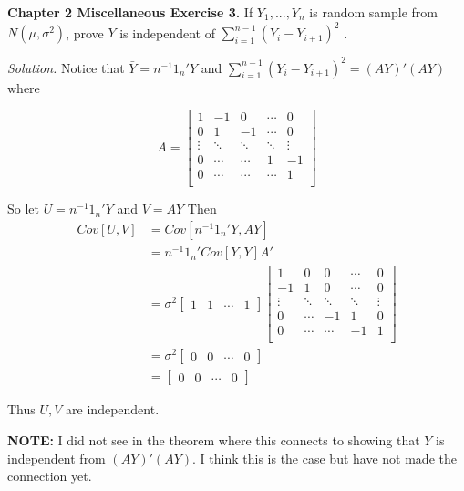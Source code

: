 \documentclass{article}
\begin{document}
\newpage
\textbf{Chapter 2 Miscellaneous Exercise 3. }
If \(Y_1, ..., Y_n\) is random sample from \(N(\mu, \sigma^2)\), prove \(\bar Y \) is independent of \(\sum_{i=1}^{n-1} (Y_i-Y_{i+1})^2\) .




 \vspace{3mm}
 
 \textit{Solution. } Notice that \(\bar Y= n^{-1}1_n' Y \) and \(\sum_{i=1}^{n-1} (Y_i-Y_{i+1})^2 = (AY)'(AY) \) 
 where
 
 \[A = \begin{bmatrix} 1&-1&0&\cdots&0\\
 0&1&-1&\cdots &0\\
 \vdots&\ddots&\ddots&\ddots & \vdots\\
 0&\cdots&\cdots &1& -1\\
  0&\cdots&\cdots &\cdots& 1\\
 \end{bmatrix}\]
 
 So let \(U =  n^{-1}1_n' Y\) and \(V = AY\) Then 
 \begin{align*}
 Cov[U,V] &= Cov[ n^{-1}1_n' Y,AY]  \\
 &= n^{-1}1_n' Cov[Y,Y] A' \\
 &=\sigma^2\begin{bmatrix}
 1&1&\cdots&1
 \end{bmatrix}
 \begin{bmatrix} 1&0&0&\cdots&0\\
 -1&1&0&\cdots &0\\
 \vdots&\ddots&\ddots&\ddots & \vdots\\
 0&\cdots&-1 &1& 0\\
  0&\cdots&\cdots &-1& 1\\
 \end{bmatrix}\\
 &= \sigma^2 \begin{bmatrix}
 0&0&\cdots&0
 \end{bmatrix}\\
 &= \begin{bmatrix}
 0&0&\cdots&0
 \end{bmatrix}
 \end{align*}
 
 Thus \(U,V\) are independent. 
 
 \vspace{15mm} 
 \textbf{NOTE:} I did not see in the theorem where this connects to showing that \(\bar Y \) is independent from \((AY)'(AY)\). I think this is the case but have not made the connection yet. 
 
\end{document}
